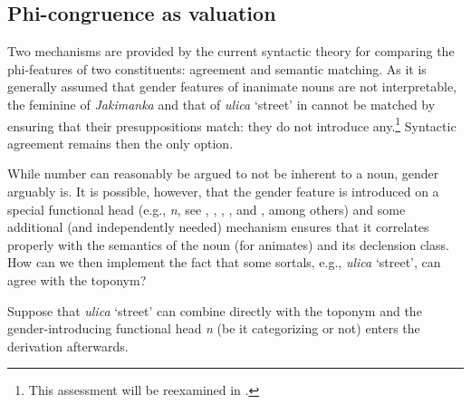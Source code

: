 \documentclass[output=paper,colorlinks,citecolor=brown]{langscibook}
\begin{document}
\subsection{Phi-congruence as valuation}\label{mat:sec:phi-congruence-as-valuation}

Two mechanisms are provided by the current syntactic theory for comparing the phi-features of two constituents: agreement and semantic matching. As it is generally assumed that gender features of inanimate nouns are not interpretable, the feminine of \textit{Jakimanka} and that of \textit{ulica} ‘street’ in  cannot be matched by ensuring that their presuppositions match: they do not introduce any.\footnote{This assessment will be reexamined in .} Syntactic agreement remains then the only option.

While number can reasonably be argued to not be inherent to a noun, gender arguably is. It is possible, however, that the gender feature is introduced on a special functional head (e.g., \textit{n}, see \citealt{Kihm2005}, \citealt{Lowenstamm2007}, \citealt{Acquaviva2009}, \citealt{Percus2011}, and \citealt{Kramer2015}, among others) and some additional (and independently needed) mechanism ensures that it correlates properly with the semantics of the noun (for animates) and its declension class. How can we then implement the fact that some sortals, e.g., \textit{ulica} ‘street’, can agree with the toponym?

Suppose that \textit{ulica} ‘street’ can combine directly with the toponym and the gender-introducing functional head \textit{n} (be it categorizing or not) enters the derivation afterwards.
\end{document}

